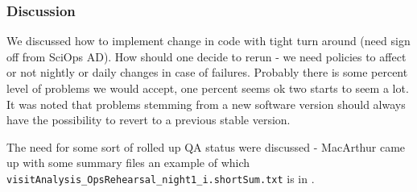 \subsubsection{Discussion}
We discussed how to implement change in code with tight turn around (need sign off from SciOps \gls{AD}).
How should one decide to rerun -  we need policies to affect or not nightly or daily changes in case of failures. Probably there is some percent level of problems we would accept, one percent seems ok two starts to seem a lot.  It was noted that problems stemming from a new software version should always have the possibility to revert to a previous stable version.

The need for some sort of rolled up \gls{QA} status were discussed - MacArthur came up with some summary files an example of which \texttt{visitAnalysis\_OpsRehearsal\_night1\_i.shortSum.txt} is in .

